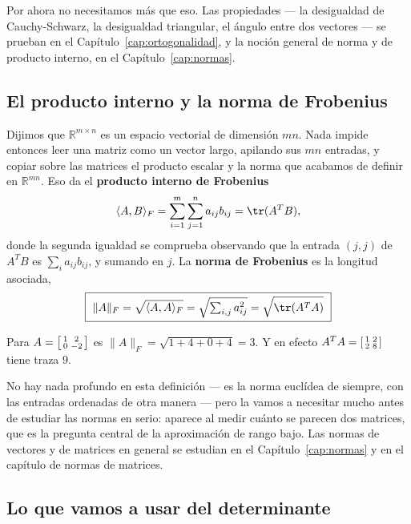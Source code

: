 Por ahora no necesitamos más que eso. Las propiedades --- la desigualdad de
Cauchy-Schwarz, la desigualdad triangular, el ángulo entre dos vectores --- se
prueban en el Capítulo~\ref{cap:ortogonalidad}, y la noción general de norma y
de producto interno, en el Capítulo~\ref{cap:normas}.

\subsection{El producto interno y la norma de Frobenius}
\label{sec:frobenius}

Dijimos que $\mathbb{R}^{m\times n}$ es un espacio vectorial de dimensión $mn$. Nada
impide entonces leer una matriz como un vector largo, apilando sus $mn$ entradas, y
copiar sobre las matrices el producto escalar y la norma que acabamos de definir en
$\mathbb{R}^{mn}$. Eso da el \textbf{producto interno de Frobenius}
\[
\langle A,B\rangle_F = \sum_{i=1}^{m}\sum_{j=1}^{n} a_{ij}b_{ij} = \tr(A^TB),
\]
donde la segunda igualdad se comprueba observando que la entrada $(j,j)$ de $A^TB$ es
$\sum_i a_{ij}b_{ij}$, y sumando en $j$. La \textbf{norma de Frobenius} es la longitud
asociada,
\[
\boxed{\ \|A\|_F=\sqrt{\langle A,A\rangle_F}=\sqrt{\textstyle\sum_{i,j}a_{ij}^{2}}
=\sqrt{\tr(A^TA)}\ }
\]

\begin{example}
Para $A=\begin{bsmallmatrix}1&2\\ 0&-2\end{bsmallmatrix}$ es
$\|A\|_F=\sqrt{1+4+0+4}=3$. Y en efecto
$A^TA=\begin{bsmallmatrix}1&2\\ 2&8\end{bsmallmatrix}$ tiene traza $9$.
\end{example}

No hay nada profundo en esta definición --- es la norma euclídea de siempre, con las
entradas ordenadas de otra manera --- pero la vamos a necesitar mucho antes de estudiar
las normas en serio: aparece al medir cuánto se parecen dos matrices, que es la pregunta
central de la aproximación de rango bajo. Las normas de vectores y de matrices en general
se estudian en el Capítulo~\ref{cap:normas} y en el capítulo de normas de
matrices.

\subsection{Lo que vamos a usar del determinante}\label{sec:determinante}

